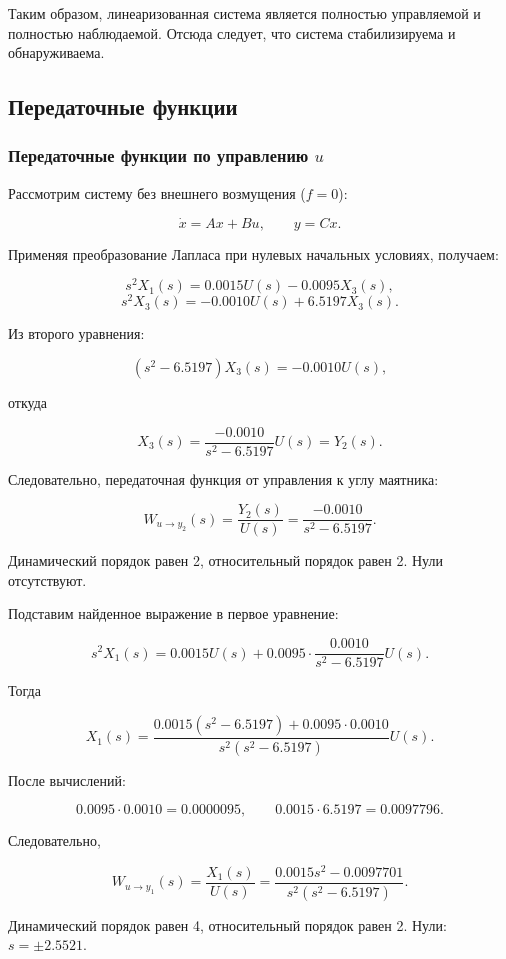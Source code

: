\documentclass[a4paper,12pt]{article}
\begin{document}
Таким образом, линеаризованная система является полностью управляемой и полностью наблюдаемой. Отсюда следует, что система стабилизируема и обнаруживаема.
		
\subsection{Передаточные функции}

\subsubsection{Передаточные функции по управлению $u$}

Рассмотрим систему без внешнего возмущения ($f = 0$):

\[
\dot{x} = Ax + Bu, \qquad y = Cx.
\]

Применяя преобразование Лапласа при нулевых начальных условиях, получаем:

\[
s^2 X_1(s) = 0.0015 U(s) - 0.0095 X_3(s),
\]
\[
s^2 X_3(s) = -0.0010 U(s) + 6.5197 X_3(s).
\]

Из второго уравнения:

\[
(s^2 - 6.5197)X_3(s) = -0.0010 U(s),
\]

откуда

\[
X_3(s) = \frac{-0.0010}{s^2 - 6.5197} U(s) = Y_2(s).
\]

Следовательно, передаточная функция от управления к углу маятника:

\[
W_{u \to y_2}(s) = \frac{Y_2(s)}{U(s)} = \frac{-0.0010}{s^2 - 6.5197}.
\]

Динамический порядок равен 2, относительный порядок равен 2. Нули отсутствуют.

Подставим найденное выражение в первое уравнение:

\[
s^2 X_1(s) = 0.0015 U(s) + 0.0095 \cdot \frac{0.0010}{s^2 - 6.5197} U(s).
\]

Тогда

\[
X_1(s) = \frac{0.0015(s^2 - 6.5197) + 0.0095 \cdot 0.0010}{s^2(s^2 - 6.5197)} U(s).
\]

После вычислений:

\[
0.0095 \cdot 0.0010 = 0.0000095, \qquad 0.0015 \cdot 6.5197 = 0.0097796.
\]

Следовательно,

\[
W_{u \to y_1}(s) = \frac{X_1(s)}{U(s)} = \frac{0.0015s^2 - 0.0097701}{s^2(s^2 - 6.5197)}.
\]

Динамический порядок равен 4, относительный порядок равен 2. Нули: $s = \pm 2.5521$.
\end{document}
